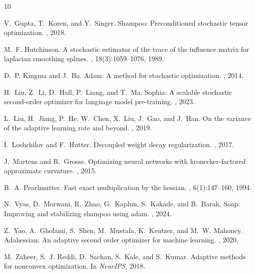 \documentclass[11pt,a4paper]{article}
\begin{document}

\begin{thebibliography}{10}

V.~Gupta, T.~Koren, and Y.~Singer.
\newblock Shampoo: Preconditioned stochastic tensor optimization.
, 2018.

M.~F. Hutchinson.
\newblock A stochastic estimator of the trace of the influence matrix for laplacian smoothing splines.
, 18(3):1059--1076, 1989.

D.~P. Kingma and J.~Ba.
\newblock Adam: A method for stochastic optimization.
, 2014.

H.~Liu, Z.~Li, D.~Hall, P.~Liang, and T.~Ma.
\newblock Sophia: A scalable stochastic second-order optimizer for language model pre-training.
, 2023.

L.~Liu, H.~Jiang, P.~He, W.~Chen, X.~Liu, J.~Gao, and J.~Han.
\newblock On the variance of the adaptive learning rate and beyond.
, 2019.

I.~Loshchilov and F.~Hutter.
\newblock Decoupled weight decay regularization.
, 2017.

J.~Martens and R.~Grosse.
\newblock Optimizing neural networks with kronecker-factored approximate curvature.
, 2015.

B.~A. Pearlmutter.
\newblock Fast exact multiplication by the hessian.
, 6(1):147--160, 1994.

N.~Vyas, D.~Morwani, R.~Zhao, G.~Kaplun, S.~Kakade, and B.~Barak.
\newblock Soap: Improving and stabilizing shampoo using adam.
, 2024.

Z.~Yao, A.~Gholami, S.~Shen, M.~Mustafa, K.~Keutzer, and M.~W. Mahoney.
\newblock Adahessian: An adaptive second order optimizer for machine learning.
, 2020.

M.~Zaheer, S.~J. Reddi, D.~Sachan, S.~Kale, and S.~Kumar.
\newblock Adaptive methods for nonconvex optimization.
\newblock In {\em NeurIPS}, 2018.

\end{thebibliography}
\end{document}
